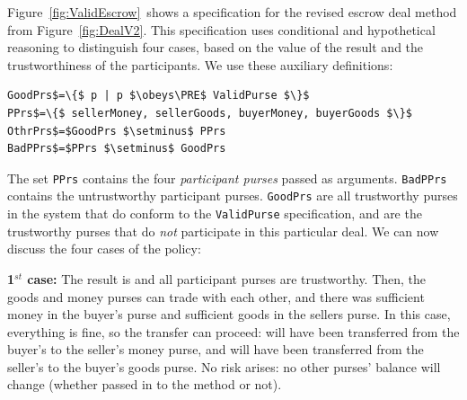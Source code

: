 %
%


Figure~\ref{fig:ValidEscrow}~shows a specification for the revised
escrow deal method from Figure~\ref{fig:DealV2}.  This specification
uses conditional and hypothetical reasoning to
distinguish four cases, based on the value of the result and
the trustworthiness of the participants.
%
We use these auxiliary definitions:
%
\begin{lstlisting}[numbers=none,frame=none,rulecolor=\color{white}]
GoodPrs$=\{$ p | p $\obeys\PRE$ ValidPurse $\}$
PPrs$=\{$ sellerMoney, sellerGoods, buyerMoney, buyerGoods $\}$
OthrPrs$=$GoodPrs $\setminus$ PPrs
BadPPrs$=$PPrs $\setminus$ GoodPrs
\end{lstlisting}
%
\vspace*{-3ex}
%
\noindent The set \lstinline{PPrs} contains the four \emph{participant purses}
passed as arguments.
\lstinline{BadPPrs} contains the untrustworthy participant purses.
\lstinline{GoodPrs} are all trustworthy purses in the system
that do conform to the \lstinline{ValidPurse} specification, and
 are the trustworthy purses that do
\textit{not} participate in this particular deal.
We can now discuss the four cases of the policy:


\textbf{1$^{st}$ case:} The result is  and all participant
  purses are trustworthy. Then, the goods and money purses
  can trade with each other, and there was sufficient
  money in the buyer's purse and sufficient goods in the sellers purse.
  In this case, everything is fine, so the transfer can proceed:
   will have been transferred from the buyer's to the
  seller's money purse, and  will have been transferred from
  the seller's to the buyer's goods purse.
  No risk arises:
  no other
  purses' balance will change (whether passed in to
  the method or not).


